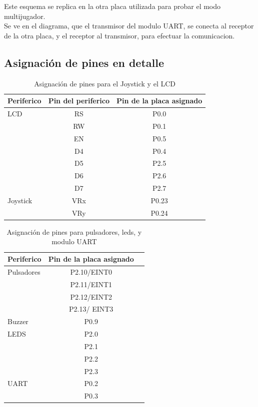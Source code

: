 \documentclass[paper=letter, fontsize=12pt]{article}
\begin{document}
\hfill \break
Este esquema se replica en la otra placa utilizada para probar el modo multijugador. \\

Se ve en el diagrama, que el transmisor del modulo UART, se conecta al receptor de la otra placa, y el receptor al transmisor, para efectuar la comunicacion. \\



\subsection{Asignación de pines en detalle}
\begin{table}[H]
\centering
\begin{tabular}{l@{\hskip 0.5in}c@{\hskip 0.5in}c}
\toprule
Periferico & Pin del periferico \hfill \hfill \hfill & Pin de la placa asignado \\ \midrule
 LCD & RS   &  P0.0 \\
  & RW   & P0.1 \\
 & EN   & P0.5 \\
 & D4   & P0.4 \\
 & D5   & P2.5 \\
 & D6   & P2.6 \\
 & D7   & P2.7 \\ \bottomrule
 Joystick & VRx  &  P0.23 \\
  & VRy   & P0.24 \\\bottomrule
\end{tabular}
\caption{Asignación de pines para el Joystick y el LCD}
\label{PINES}
\end{table}

\hfill \break

\begin{table}[H]
\centering
\begin{tabular}{l@{\hskip 0.5in}c@{\hskip 0.5in}c}
\toprule
Periferico \hfill \hfill & Pin de la placa asignado \\ \midrule
Pulsadores &   P2.10/EINT0\\
 &  P2.11/EINT1 \\
 &   P2.12/EINT2 \\
 &   P2.13/ EINT3  \\ \bottomrule
Buzzer &  P0.9\\ \bottomrule
LEDS &  P2.0 \\ 
 &  P2.1 \\
 &  P2.2\\
 &  P2.3\\ \bottomrule
 UART  & P0.2 \\
  &  P0.3 \\ \bottomrule
    \end{tabular}
\caption{Asignación de pines para pulsadores, leds, y modulo UART}
\label{PINES}
\end{table}
\clearpage
\end{document}
